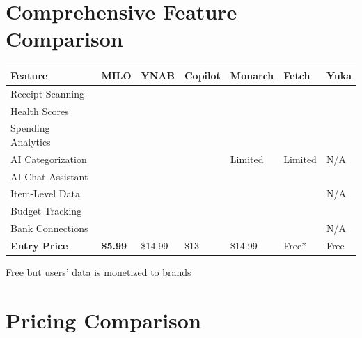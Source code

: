 \documentclass[11pt,a4paper]{report}
\newcommand{\cmark}{\textcolor{successgreen}{\ding{51}}}
\newcommand{\xmark}{\textcolor{dangerred}{\ding{55}}}
\begin{document}
\newpage

\section{Comprehensive Feature Comparison}

\begin{center}
\renewcommand{\arraystretch}{1.5}
\begin{tabular}{>{\raggedright\arraybackslash}p{3.5cm} >{\centering\arraybackslash}p{1.5cm} >{\centering\arraybackslash}p{1.5cm} >{\centering\arraybackslash}p{1.5cm} >{\centering\arraybackslash}p{1.5cm} >{\centering\arraybackslash}p{1.5cm} >{\centering\arraybackslash}p{1.5cm}}
\toprule
\rowcolor{kbcblue!15}
\textbf{Feature} & \textbf{MILO} & \textbf{YNAB} & \textbf{Copilot} & \textbf{Monarch} & \textbf{Fetch} & \textbf{Yuka} \\
\midrule
Receipt Scanning & \cmark & \xmark & \xmark & \xmark & \cmark & \xmark \\
\rowcolor{lightbg}
Health Scores & \cmark & \xmark & \xmark & \xmark & \xmark & \cmark \\
Spending Analytics & \cmark & \cmark & \cmark & \cmark & \xmark & \xmark \\
\rowcolor{lightbg}
AI Categorization & \cmark & \xmark & \cmark & Limited & Limited & N/A \\
AI Chat Assistant & \cmark & \xmark & \cmark & \xmark & \xmark & \xmark \\
\rowcolor{lightbg}
Item-Level Data & \cmark & \xmark & \xmark & \xmark & \xmark & N/A \\
Budget Tracking & \cmark & \cmark & \cmark & \cmark & \xmark & \xmark \\
\rowcolor{lightbg}
Bank Connections & \xmark & \cmark & \cmark & \cmark & \xmark & N/A \\
\midrule
\rowcolor{successgreen!10}
\textbf{Entry Price} & \textcolor{successgreen}{\textbf{\$5.99}} & \$14.99 & \$13 & \$14.99 & Free* & Free \\
\bottomrule
\end{tabular}
\end{center}

{\small *Free but users' data is monetized to brands}

\vspace{0.5cm}

\section{Pricing Comparison}
\end{document}
